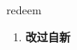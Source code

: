 
\begin{frame}
{\huge redeem}
\begin{center}
\begin{enumerate}\Large
  \item \textbf{改过自新}
\end{enumerate}
\end{center}
\end{frame}
